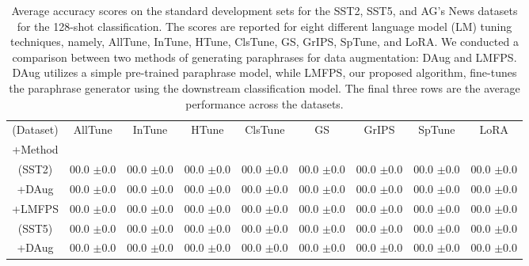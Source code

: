 \documentclass[11pt]{article}
\begin{document}
\begin{table*}
\centering
\caption{Average accuracy scores on the standard development sets for the SST2, SST5, and AG's News datasets for the 128-shot classification. The scores are reported for eight different language model (LM) tuning techniques, namely, AllTune, InTune, HTune, ClsTune, GS, GrIPS, SpTune, and LoRA. We conducted a comparison between two methods of generating paraphrases for data augmentation: DAug and LMFPS. DAug utilizes a simple pre-trained paraphrase model, while LMFPS, our proposed algorithm, fine-tunes the paraphrase generator using the downstream classification model. The final three rows are the average performance across the datasets.}
\begin{tabular}{c | c | c | c | c | c | c | c | c}
\hline
(Dataset) & AllTune & InTune & HTune & ClsTune & GS & GrIPS & SpTune & LoRA \\
\small+Method &  &  &  &  &  &  &  &  \\
\hline
(SST2) & \small00.0 \small$\pm$\small0.0 & \small00.0 \small$\pm$\small0.0 & \small00.0 \small$\pm$\small0.0 & \small00.0 \small$\pm$\small0.0 & \small00.0 \small$\pm$\small0.0 & \small00.0 \small$\pm$\small0.0 & \small00.0 \small$\pm$\small0.0 & \small00.0 \small$\pm$\small0.0\\
\small+DAug & \small00.0 \small$\pm$\small0.0 & \small00.0 \small$\pm$\small0.0 & \small00.0 \small$\pm$\small0.0 & \small00.0 \small$\pm$\small0.0 & \small00.0 \small$\pm$\small0.0 & \small00.0 \small$\pm$\small0.0 & \small00.0 \small$\pm$\small0.0 & \small00.0 \small$\pm$\small0.0\\
\small+LMFPS & \small00.0 \small$\pm$\small0.0 & \small00.0 \small$\pm$\small0.0 & \small00.0 \small$\pm$\small0.0 & \small00.0 \small$\pm$\small0.0 & \small00.0 \small$\pm$\small0.0 & \small00.0 \small$\pm$\small0.0 & \small00.0 \small$\pm$\small0.0 & \small00.0 \small$\pm$\small0.0\\
\hline
(SST5) & \small00.0 \small$\pm$\small0.0 & \small00.0 \small$\pm$\small0.0 & \small00.0 \small$\pm$\small0.0 & \small00.0 \small$\pm$\small0.0 & \small00.0 \small$\pm$\small0.0 & \small00.0 \small$\pm$\small0.0 & \small00.0 \small$\pm$\small0.0 & \small00.0 \small$\pm$\small0.0\\
\small+DAug & \small00.0 \small$\pm$\small0.0 & \small00.0 \small$\pm$\small0.0 & \small00.0 \small$\pm$\small0.0 & \small00.0 \small$\pm$\small0.0 & \small00.0 \small$\pm$\small0.0 & \small00.0 \small$\pm$\small0.0 & \small00.0 \small$\pm$\small0.0 & \small00.0 \small$\pm$\small0.0\\

\end{tabular}
\end{table*}
\end{document}
